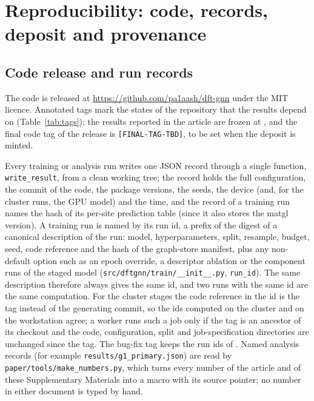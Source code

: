 \section{Reproducibility: code, records, deposit and provenance}
\label{si:repro}

\subsection{Code release and run records}

The code is released at \url{https://github.com/pa1aash/dft-gnn} under the MIT licence. Annotated tags mark the
states of the repository that the results depend on (Table~\ref{tab:tags}); the results reported in the article are
frozen at \tagresults{}, and the final code tag of the release is \texttt{[FINAL-TAG-TBD]}, to be set when the
deposit is minted.

\begin{table}[htbp]
\caption{Annotated tags of the code repository and what each marks (\texttt{git tag -n1}).}
\label{tab:tags}
\centering\small

\end{table}

Every training or analysis run writes one JSON record through a single function, \texttt{write\_result}, from a
clean working tree; the record holds the full configuration, the commit of the code, the package versions, the
seeds, the device (and, for the cluster runs, the GPU model) and the time, and the record of a training run names the hash of its per-site prediction table
(since \tagnrpthree{} it also stores the matgl version). A training run is named by its run id, a prefix of the
\shatwo{} digest of a canonical description of the run: model, hyperparameters, split, resample, budget, seed, code
reference and the hash of the graph-store manifest, plus any non-default option such as an epoch override, a
descriptor ablation or the component runs of the staged model (\texttt{src/dftgnn/train/\_\_init\_\_.py},
\texttt{run\_id}). The same description therefore always gives the same id, and two runs with the same id are the
same computation. For the cluster stages the code reference in the id is the tag \tagnrpone{} instead of the
generating commit, so the ids computed on the cluster and on the workstation agree; a worker runs such a job only if
the tag is an ancestor of its checkout and the code, configuration, split and job-specification directories are
unchanged since the tag. The bug-fix tag \tagnrptwo{} keeps the run ids of \tagnrpone{}. Named analysis records
(for example \texttt{results/g1\_primary.json}) are read by \texttt{paper/tools/make\_numbers.py}, which turns every
number of the article and of these Supplementary Materials into a macro with its source pointer; no number in
either document is typed by hand.

